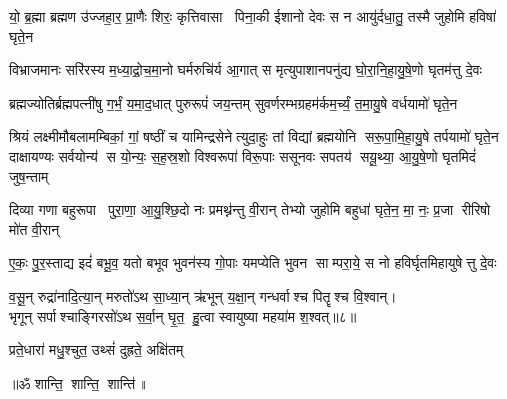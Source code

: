 

\twolineshloka
{यो॒ ब्र॒ह्मा ब्रह्मण उ॑ज्जहा॒र॒ प्रा॒णैः शिरः॒ कृत्तिवासा पिना॒की}
{ईशानो देवः स न आयु॑र्दधा॒तु॒ तस्मै जुहोमि हविषा॑ घृते॒न}

\twolineshloka
{विभ्राजमानः सरि॑रस्य म॒ध्या॒द्रो॒च॒मा॒नो घर्मरुचि॑र्य आ॒गात्}
{स मृत्युपाशानपनु॑द्य घो॒रा॒नि॒हा॒यु॒षे॒णो घृतम॑त्तु दे॒वः}

\twolineshloka
{ब्रह्मज्योतिर्ब्रह्मपत्नी॑षु  ग॒र्भं॒ य॒मा॒द॒धात् पुरुरूपं॑ जय॒न्तम्}
{सुवर्णरम्भग्रहम॑र्कम॒र्च्यं॒ त॒मा॒यु॒षे वर्धयामो॑ घृते॒न}

\twolineshloka
{श्रियं लक्ष्मीमौबलामम्बिकां॒ गां॒ षष्ठीं च यामिन्द्रसेनेत्युदा॒हुः}
{तां विद्यां ब्रह्मयोनि सरू॒पा॒मि॒हा॒यु॒षे तर्पयामो॑ घृते॒न}
\twolineshloka
{दाक्षायण्यः सर्वयोन्य॑ स यो॒न्यः॒ स॒ह॒स्र॒शो विश्वरूपा॑ विरू॒पाः}
{ससूनवः सपतय॑ सयू॒थ्या॒ आ॒यु॒षे॒णो घृतमिदं॑ जुष॒न्ताम्}

\twolineshloka
{दिव्या गणा बहुरूपा पुरा॒णा॒ आ॒यु॒श्छि॒दो नः प्रमथ्न॑न्तु वी॒रान्}
{तेभ्यो जुहोमि बहुधा॑ घृते॒न॒ मा॒ नः॒ प्र॒जा रीरिषो मो॑त वी॒रान्}

\twolineshloka
{ए॒कः॒ पु॒र॒स्ताद्य इदं॑ बभू॒व॒ यतो बभूव भुवन॑स्य गो॒पाः}
{यमप्येति भुवन साम्परा॒ये॒ स नो हविर्घृतमिहायुषेत्तु दे॒वः}

व॒सू॒न् रुद्रा॑नादि॒त्या॒न् मरुतो॑ऽथ सा॒ध्या॒न् ऋ॑भून् य॒क्षा॒न् गन्धर्वाश्च पितॄश्च वि॒श्वान्।\\
 भृगून् सर्पाश्चाङ्गिरसो॑ऽथ स॒र्वा॒न् घृ॒त॒ हु॒त्वा स्वायुष्या महया॑म श॒श्वत्॥८॥

{प्रते॒धारा॑ मधु॒श्चुत॒ उथ्सं॑ दुह्रते॒ अक्षि॑तम्}

\centerline{॥ॐ शान्ति॒ शान्ति॒ शान्ति॑॥}